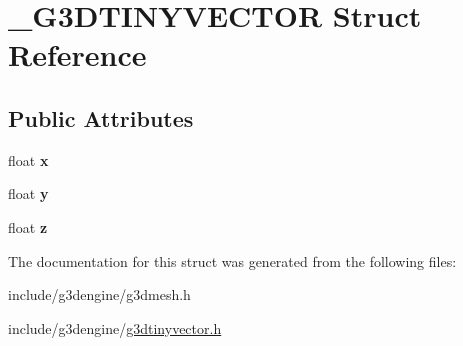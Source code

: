 \hypertarget{struct__G3DTINYVECTOR}{}\section{\+\_\+\+G3\+D\+T\+I\+N\+Y\+V\+E\+C\+T\+OR Struct Reference}
\label{struct__G3DTINYVECTOR}
\subsection*{Public Attributes}
\begin{DoxyCompactItemize}
\item 
\mbox{\label{struct__G3DTINYVECTOR_a17d3693548709cf49d0c58f7fe198f05}} 
float {\bfseries x}
\item 
\mbox{\label{struct__G3DTINYVECTOR_af48f36e849281d17c1b304070e3ebf8e}} 
float {\bfseries y}
\item 
\mbox{\label{struct__G3DTINYVECTOR_af3b0411bc9db051ace1b05cd3220496a}} 
float {\bfseries z}
\end{DoxyCompactItemize}


The documentation for this struct was generated from the following files\+:\begin{DoxyCompactItemize}
\item 
include/g3dengine/g3dmesh.\+h\item 
include/g3dengine/\hyperlink{g3dtinyvector_8h}{g3dtinyvector.\+h}\end{DoxyCompactItemize}

